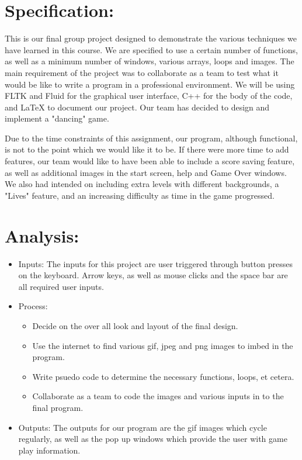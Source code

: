 \documentclass {article}
\begin{document}
\section*{Specification:}
This is our final group project designed to demonstrate the various techniques we have learned in this course. We are specified to use a certain number of functions, as well as a minimum number of windows, various arrays, loops and images. The main requirement of the project was to collaborate as a team to test what it would be like to write a program in a professional environment. We will be using FLTK and Fluid for the graphical user interface, C++ for the body of the code, and LaTeX to document our project. Our team has decided to design and implement a "dancing" game.


Due to the time constraints of this assignment, our program, although functional, is not to the point which we would like it to be. If there were more time to add features, our team would like to have been able to include a score saving feature, as well as additional images in the start screen, help and Game Over windows. We also had intended on including extra levels with different backgrounds, a "Lives" feature, and an increasing difficulty as time in the game progressed.
\clearpage

\section*{Analysis:}

\begin{itemize}
\item Inputs: 
The inputs for this project are user triggered through button presses on the keyboard. Arrow keys, as well as mouse clicks and the space bar are all required user inputs.
\item Process: 
\begin{itemize} 
\item Decide on the over all look and layout of the final design.
\item Use the internet to find various gif, jpeg and png images to imbed in the program.
\item Write psuedo code to determine the necessary functions, loops, et cetera.
\item Collaborate as a team to code the images and various inputs in to the final program.
\end{itemize} 
\item Outputs:
The outputs for our program are the gif images which cycle regularly, as well as the pop up windows which provide the user with game play information.
\end{itemize}
\end{document}
